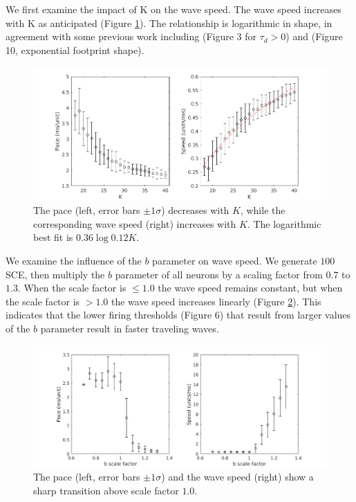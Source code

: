 \documentclass[12pt]{article}
\begin{document}
\color{red} 
We first examine the impact of K on the wave speed.
The wave speed increases with K as anticipated (Figure \ref{fig:delay_k}).
The relationship is logarithmic in shape, in agreement with some previous work including \parencite{Golomb1999} (Figure 3 for $\tau_d>0$) and \parencite{Golomb1996}(Figure 10, exponential footprint shape).
\color{black}

\begin{figure}[!htb]
 \caption{The pace (left, error bars $\pm 1 \sigma$) decreases with $K$, while the corresponding wave speed (right) increases with $K$. 
          \color{red}The logarithmic best fit is $0.36\log{0.12K}$\color{black}.}
 \label{fig:delay_k}
 \centering
   \includegraphics[width=\textwidth]{fig/WaveSpeed_K}
\end{figure}

\color{red}
We examine the influence of the $b$ parameter on wave speed.
We generate $100$ SCE, then multiply the $b$ parameter of all neurons by a scaling factor from $0.7$ to $1.3$.
When the scale factor is $\leq 1.0$ the wave speed remains constant, but when the scale factor is $>1.0$ the wave speed increases linearly (Figure \ref{fig:WaveSpeed_B}).
This indicates that the lower firing thresholds (Figure 6) that result from larger values of the $b$ parameter result in faster traveling waves.
\color{black}
\begin{figure}[!htb]
 \caption{The pace (left, error bars $\pm 1 \sigma$) and the wave speed (right) show a sharp transition above scale factor $1.0$. }
 \label{fig:WaveSpeed_B}
 \centering
   \includegraphics[width=\textwidth]{fig/WaveSpeed_B}
\end{figure}
\end{document}
